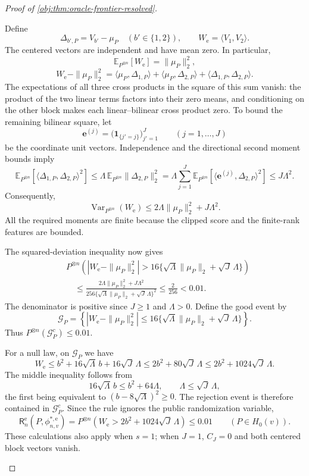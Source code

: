 \documentclass[11pt]{article}
\begin{document}
\begin{proof}[Proof of \cref{obj:thm:oracle-frontier-resolved}]
\begin{enumerate}
Define
\[
\Delta_{b',P}=V_{b'}-\mu_P\quad(b'\in\{1,2\}),
\qquad
W_{\mathrm e}=\langle V_1,V_2\rangle.
\]
The centered vectors are independent and have mean zero. In particular,
\[
\mathbb E_{P^{\otimes n}}[W_{\mathrm e}]=\|\mu_P\|_2^2,
\]
\[
W_{\mathrm e}-\|\mu_P\|_2^2
=
\langle\mu_P,\Delta_{1,P}\rangle
+\langle\mu_P,\Delta_{2,P}\rangle
+\langle\Delta_{1,P},\Delta_{2,P}\rangle.
\]
The expectations of all three cross products in the square of this sum vanish: the product of the two linear terms factors into their zero means, and conditioning on the other block makes each linear--bilinear cross product zero. To bound the remaining bilinear square, let
\[
\mathbf e^{(j)}
=\bigl(\mathbf1_{\{j'=j\}}\bigr)_{j'=1}^{J}
\qquad(j=1,\ldots,J)
\]
be the coordinate unit vectors. Independence and the directional second moment bounds imply
\[
\mathbb E_{P^{\otimes n}}
\!\left[\langle\Delta_{1,P},\Delta_{2,P}\rangle^2\right]
\le\Lambda\,\mathbb E_{P^{\otimes n}}\|\Delta_{2,P}\|_2^2
=\Lambda\sum_{j=1}^{J}
\mathbb E_{P^{\otimes n}}
\!\left[\langle\mathbf e^{(j)},\Delta_{2,P}\rangle^2\right]
\le J\Lambda^2.
\]
Consequently,
\[
\operatorname{Var}_{P^{\otimes n}}(W_{\mathrm e})
\le2\Lambda\|\mu_P\|_2^2+J\Lambda^2.
\]
All the required moments are finite because the clipped score and the finite-rank features are bounded.

The squared-deviation inequality now gives
\[
\begin{aligned}
&P^{\otimes n}\!\left(
|W_{\mathrm e}-\|\mu_P\|_2^2|
>16\{\sqrt\Lambda\|\mu_P\|_2+\sqrt J\,\Lambda\}
\right)\\
&\quad\le
\frac{2\Lambda\|\mu_P\|_2^2+J\Lambda^2}
{256\{\sqrt\Lambda\|\mu_P\|_2+\sqrt J\,\Lambda\}^2}
\le\frac{2}{256}<0.01.
\end{aligned}
\]
The denominator is positive since \(J\ge1\) and \(\Lambda>0\).
Define the good event by
\[
\mathcal G_P=
\left\{
|W_{\mathrm e}-\|\mu_P\|_2^2|
\le16\{\sqrt\Lambda\|\mu_P\|_2+\sqrt J\,\Lambda\}
\right\}.
\]
Thus \(P^{\otimes n}(\mathcal G_P^c)\le0.01\).

For a null law, on \(\mathcal G_P\) we have
\[
W_{\mathrm e}
\le b^2+16\sqrt\Lambda\,b+16\sqrt J\,\Lambda
\le2b^2+80\sqrt J\,\Lambda
\le2b^2+1024\sqrt J\,\Lambda.
\]
The middle inequality follows from
\[
16\sqrt\Lambda\,b\le b^2+64\Lambda,
\qquad
\Lambda\le\sqrt J\,\Lambda,
\]
the first being equivalent to \((b-8\sqrt\Lambda)^2\ge0\).
The rejection event is therefore contained in \(\mathcal G_P^c\). Since the rule ignores the public randomization variable,
\[
\mathsf R_n^{\mathrm e}(P,\phi^{*,\mathrm e}_{n,v})
=
P^{\otimes n}\!\left(
W_{\mathrm e}>2b^2+1024\sqrt J\,\Lambda
\right)
\le0.01
\qquad(P\in H_0(v)).
\]
These calculations also apply when \(s=1\); when \(J=1\), \(C_J=0\) and both centered block vectors vanish.


\end{enumerate}
\end{proof}
\end{document}
